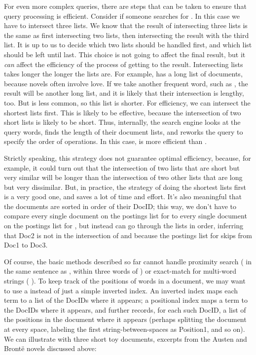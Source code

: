 For even more complex queries, there are steps that can be taken to
ensure that query processing is efficient.  Consider if someone
searches for .  In this
case we have to intersect three lists.  
We know that the result of intersecting three lists is the same as
first intersecting two lists, then intersecting the result with
the third list.
It is up to us to decide which two lists should be handled first,
and which list should be left until last.
This choice is not going to affect the final result, but  it \emph{can} affect
the efficiency of the process of getting to the result.  
  Intersecting
lists takes longer the longer the lists are.  For example,
 has a long list of documents, because novels often involve love.  If we take another frequent
word, such as , the result will be another long list,
and it is likely that their intersection is lengthy, too.  But  is less common,  so
this list is shorter.  
For efficiency, we can intersect the shortest lists first.
This is likely to be effective, because the intersection of
two short lists is likely to be short.
Thus, internally, the search engine looks at the query
words, finds the length of their document lists, and reworks the query
to specify the order of operations.  In this case,   is more efficient than .
  
Strictly speaking, this strategy does not guarantee optimal efficiency, because, 
for example, it could turn out that the intersection of two lists that
are short but very similar will be longer than the intersection of two 
other lists that are long but very dissimilar. But, in practice, the
strategy of doing the shortest lists first is a very good one, and saves
a lot of time and effort.  It's also meaningful that the documents are sorted in order of their DocID; this way, we don't have to compare every single document on the postings list for  to every single document on the postings list for , but instead can go through the lists in order, inferring that Doc2 is not in the intersection of  and  because the postings list for  skips from Doc1 to Doc3. 

Of course, the basic methods described so far cannot handle proximity search ( in the same sentence as ,  within three words of ) or exact-match for multi-word strings ( ).   To keep track of the positions of words in a document, we may want to use a  instead of just a simple inverted index.   An inverted index maps each term to a list of the DocIDs where it appears; a positional index maps a term to the DocIDs where it appears, and further records, for each such DocID, a list of the positions in the document where it appears (perhaps splitting the document at every space, labeling the first string-between-spaces as Position1, and so on).  We can illustrate with three short toy documents, excerpts from the Austen and Bront\"e novels discussed above:

